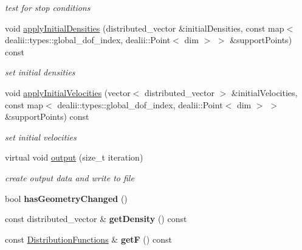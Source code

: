 \begin{DoxyCompactItemize}
\begin{DoxyCompactList}\small\item\em test for stop conditions \item\end{DoxyCompactList}\item 
void \hyperlink{classnatrium_1_1CFDSolver_a36146c0f8a6c5abd0ebec4c49f2a4e6d}{applyInitialDensities} (distributed\_\-vector \&initialDensities, const map$<$ dealii::types::global\_\-dof\_\-index, dealii::Point$<$ dim $>$ $>$ \&supportPoints) const 
\begin{DoxyCompactList}\small\item\em set initial densities \item\end{DoxyCompactList}\item 
void \hyperlink{classnatrium_1_1CFDSolver_afd82bfa5e1e613ef99b9b870cb73db0e}{applyInitialVelocities} (vector$<$ distributed\_\-vector $>$ \&initialVelocities, const map$<$ dealii::types::global\_\-dof\_\-index, dealii::Point$<$ dim $>$ $>$ \&supportPoints) const 
\begin{DoxyCompactList}\small\item\em set initial velocities \item\end{DoxyCompactList}\item 
virtual void \hyperlink{classnatrium_1_1CFDSolver_abf6804f132885502b61877fc1f9ca4a2}{output} (size\_\-t iteration)
\begin{DoxyCompactList}\small\item\em create output data and write to file \item\end{DoxyCompactList}\item 
\hypertarget{classnatrium_1_1CFDSolver_a9c3f844b4c6b670aac83bc3ad5519fad}{
bool {\bfseries hasGeometryChanged} ()}
\label{classnatrium_1_1CFDSolver_a9c3f844b4c6b670aac83bc3ad5519fad}

\item 
\hypertarget{classnatrium_1_1CFDSolver_adf0b4e4da292bcb195d926d3174ba2a9}{
const distributed\_\-vector \& {\bfseries getDensity} () const }
\label{classnatrium_1_1CFDSolver_adf0b4e4da292bcb195d926d3174ba2a9}

\item 
\hypertarget{classnatrium_1_1CFDSolver_a963e069873d88d130b0fe3f7f77c3d83}{
const \hyperlink{classnatrium_1_1DistributionFunctions}{DistributionFunctions} \& {\bfseries getF} () const }
\label{classnatrium_1_1CFDSolver_a963e069873d88d130b0fe3f7f77c3d83}


\end{DoxyCompactItemize}
